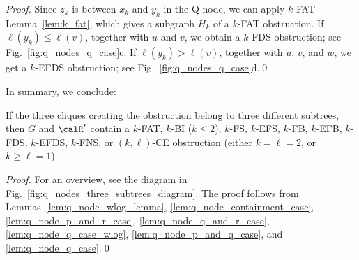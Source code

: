 \begin{proof}
Since $z_k$ is between $x_k$ and $y_k$ in the Q-node, we can apply $k$-FAT Lemma~\ref{lem:k_fat},
which gives a subgraph $H_k$ of a $k$-FAT obstruction.  If $\ell(y_k) \le \ell(v)$, together with
$u$ and $v$, we obtain a $k$-FDS obstruction; see Fig.~\ref{fig:q_nodes_q_case}c. If $\ell(y_k) >
\ell(v)$, together with $u$, $v$, and $w$, we get a $k$-EFDS obstruction; see
Fig.~\ref{fig:q_nodes_q_case}d.\qed
\end{proof}

In summary, we conclude:

\begin{lemma} \label{lem:q_node_three}
If the three cliques creating the obstruction belong to three different subtrees, then $G$ and
$\calR'$ contain a $k$-FAT, $k$-BI ($k \le 2$), $k$-FS, $k$-EFS, $k$-FB, $k$-EFB, $k$-FDS,
$k$-EFDS, $k$-FNS, or $(k,\ell)$-CE obstruction (either $k=\ell=2$, or $k \ge \ell = 1$).
\end{lemma}

\begin{proof}
For an overview, see the diagram in Fig.~\ref{fig:q_nodes_three_subtrees_diagram}. The proof follows
from Lemmas~\ref{lem:q_node_wlog_lemma}, \ref{lem:q_node_containment_case},
\ref{lem:q_node_p_and_r_case}, \ref{lem:q_node_q_and_r_case}, \ref{lem:q_node_q_case_wlog},
\ref{lem:q_node_p_and_q_case}, and \ref{lem:q_node_q_case}.\qed
\end{proof}
